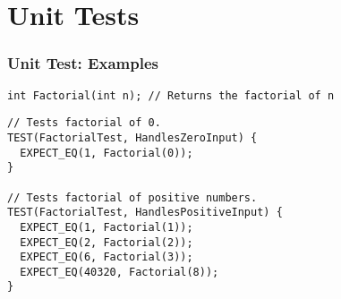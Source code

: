 \documentclass{beamer}
\begin{document}
\section{Unit Tests}

\begin{frame}[fragile]
  \frametitle{Unit Test: Examples}
  \begin{lstlisting}[title=Unit to Test, style=code]
int Factorial(int n); // Returns the factorial of n
  \end{lstlisting}
  \pause
  \begin{lstlisting}[title=\href{https://code.google.com/p/googletest/wiki/Primer\#Simple_Tests}{GTest Primer Example}, style=code]
// Tests factorial of 0.
TEST(FactorialTest, HandlesZeroInput) {
  EXPECT_EQ(1, Factorial(0));
}

// Tests factorial of positive numbers.
TEST(FactorialTest, HandlesPositiveInput) {
  EXPECT_EQ(1, Factorial(1));
  EXPECT_EQ(2, Factorial(2));
  EXPECT_EQ(6, Factorial(3));
  EXPECT_EQ(40320, Factorial(8));
}
  \end{lstlisting}
\end{frame}
\end{document}
